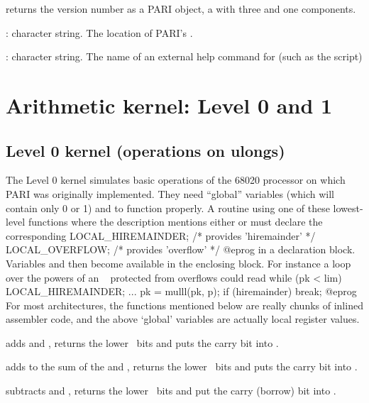 
 returns the version number as a PARI object, a
 with three  and one  components.


: character string. The location of PARI's .

: character string. The name of an external help command
for  (such as the  script)

\newpage
\chapter{Arithmetic kernel: Level 0 and 1}

\section{Level 0 kernel (operations on ulongs)}

The Level 0 kernel simulates basic operations of the 68020 processor on which
PARI was originally implemented. They need ``global''  variables
 (which will contain only 0 or 1) and  to
function properly. A routine using one of these lowest-level functions
where the description mentions either  or 
must declare the corresponding
\bprog
  LOCAL_HIREMAINDER;  /* provides 'hiremainder' */
  LOCAL_OVERFLOW;     /* provides 'overflow' */
@eprog\noindent
in a declaration block. Variables  and  then
become available in the enclosing block. For instance a loop over the powers
of an ~ protected from overflows could read
\bprog
 while (pk < lim)
 {
   LOCAL_HIREMAINDER;
   ...
   pk = mulll(pk, p); if (hiremainder) break;
 }
@eprog\noindent
For most architectures, the functions mentioned below are really chunks of
inlined assembler code, and the above `global' variables are actually
local register values.

 adds  and , returns the
lower \B\ bits and puts the carry bit into .

 adds  to the sum of the
 and , returns the lower \B\ bits and puts the carry bit into
.

 subtracts  and , returns
the lower \B\ bits and put the carry (borrow) bit into .

